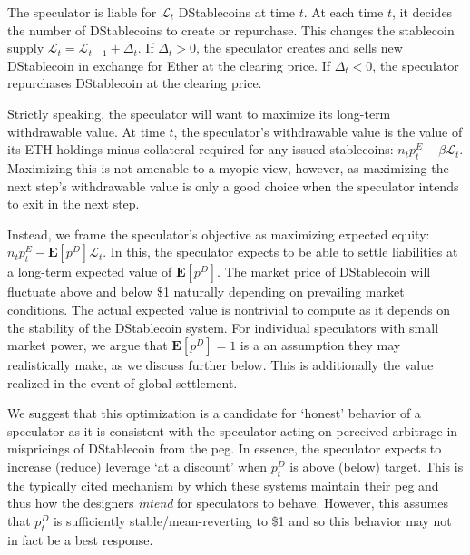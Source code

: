 The speculator is liable for $\mathcal{L}_t$ DStablecoins at time $t$. At each time $t$, it decides the number of DStablecoins to create or repurchase. This changes the stablecoin supply $\mathcal{L}_t = \mathcal{L}_{t-1} + \Delta_t$. If $\Delta_t>0$, the speculator creates and sells new DStablecoin in exchange for Ether at the clearing price. If $\Delta_t<0$, the speculator repurchases DStablecoin at the clearing price.

Strictly speaking, the speculator will want to maximize its long-term withdrawable value. At time $t$, the speculator's withdrawable value is the value of its ETH holdings minus collateral required for any issued stablecoins: $n_t p_t^E - \beta\mathcal{L}_t$. Maximizing this is not amenable to a myopic view, however, as maximizing the next step's withdrawable value is only a good choice when the speculator intends to exit in the next step.

Instead, we frame the speculator's objective as maximizing expected equity: $n_t p_t^E - \mathbf{E}[p^D] \mathcal{L}_t$. In this, the speculator expects to be able to settle liabilities at a long-term expected value of $\mathbf{E}[p^D]$. The market price of DStablecoin will fluctuate above and below \$1 naturally depending on prevailing market conditions. The actual expected value is nontrivial to compute as it depends on the stability of the DStablecoin system. For individual speculators with small market power, we argue that $\mathbf{E}[p^D]=1$ is a an assumption they may realistically make, as we discuss further below. This is additionally the value realized in the event of global settlement.

We suggest that this optimization is a candidate for `honest' behavior of a speculator as it is consistent with the speculator acting on perceived arbitrage in mispricings of DStablecoin from the peg. In essence, the speculator expects to increase (reduce) leverage `at a discount' when $p_t^D$ is above (below) target. This is the typically cited mechanism by which these systems maintain their peg and thus how the designers \emph{intend} for speculators to behave. However, this assumes that $p_t^D$ is sufficiently stable/mean-reverting to \$1 and so this behavior may not in fact be a best response.




